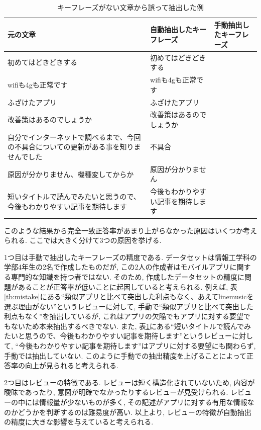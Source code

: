 \begin{table}[H]
  \caption{ キーフレーズがない文章から誤って抽出した例 }
  \label{tb:mistake2}
  \begin{center}
  \begin{tabularx}{\linewidth}{X|X|X}
    \hline
    元の文章&自動抽出したキーフレーズ&手動抽出したキーフレーズ\\\hline\hline
    初めてはどきどきする&初めてはどきどきする&\\\hline
    wifiも4gも正常です&wifiも4gも正常です&\\\hline
    ふざけたアプリ&ふざけたアプリ&\\\hline
    改善策はあるのでしょうか&改善策はあるのでしょうか&\\\hline
    自分でインターネットで調べるまで、今回の不具合についての更新がある事を知りませんでした&不具合&\\\hline
    原因が分かりません、機種変してからか&原因が分かりません&\\\hline
    短いタイトルで読んでみたいと思うので、今後もわかりやすい記事を期待します&今後もわかりやすい記事を期待します&\\\hline
  \end{tabularx}\end{center}
\end{table}

このような結果から完全一致正答率があまり上がらなかった原因はいくつか考えられる. ここでは大きく分けて3つの原因を挙げる. 

1つ目は手動で抽出したキーフレーズの精度である. データセットは情報工学科の学部4年生の2名で作成したものだが, この2人の作成者はモバイルアプリに関する専門的な知識を持つ者ではない. そのため, 作成したデータセットの精度に問題があることが正答率が低いことに起因していると考えられる. 
例えば, 表\ref{tb:mistake}にある``類似アプリと比べて突出した利点もなく、あえてlinemusicを選ぶ理由がない''というレビューに対して, 手動で``類似アプリと比べて突出した利点もなく''を抽出しているが, これはアプリの欠陥でもアプリに対する要望でもないため本来抽出するべきでない. 
また, 表\ref{tb:mistake2}にある``短いタイトルで読んでみたいと思うので、今後もわかりやすい記事を期待します''というレビューに対して, ``今後もわかりやすい記事を期待します''はアプリに対する要望にも関わらず, 手動では抽出していない. このように手動での抽出精度を上げることによって正答率の向上が見られると考えられる. 

2つ目はレビューの特徴である. レビューは短く構造化されていないため, 内容が曖昧であったり, 意図が明確でなかったりするレビューが見受けられる. レビューの中には情報量が少ないものが多く, その記述がアプリに対する有用な情報なのかどうかを判断するのは難易度が高い. 
以上より, レビューの特徴が自動抽出の精度に大きな影響を与えていると考えられる. 

